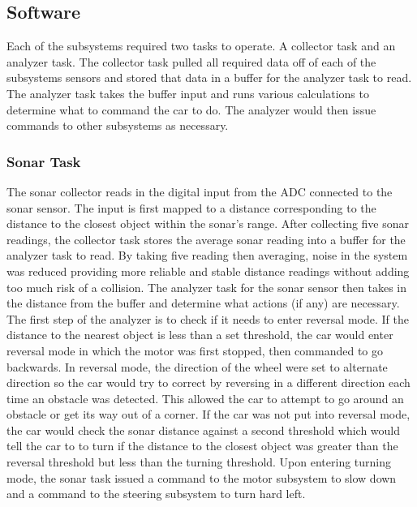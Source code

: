 \documentclass[final,letterpaper,singleside,12pt]{article}
\begin{document}
\pagebreak

\subsection{Software} %
\label{sub:software}
Each of the subsystems required two tasks to operate. A collector task and an analyzer task. The collector task pulled all required data off of each of the subsystems sensors and stored that data in a buffer for the analyzer task to read. The analyzer task takes the buffer input and runs various calculations to determine what to command the car to do. The analyzer would then issue commands to other subsystems as necessary.
\subsubsection{Sonar Task} %
\label{ssub:sonar_task}
The sonar collector reads in the digital input from the ADC connected to the sonar sensor. The input is first mapped to a distance corresponding to the distance to the closest object within the sonar's range. After collecting five sonar readings, the collector task stores the average sonar reading into a buffer for the analyzer task to read. By taking five reading then averaging, noise in the system was reduced providing more reliable and stable distance readings without adding too much risk of a collision. The analyzer task for the sonar sensor then takes in the distance from the buffer and determine what actions (if any) are necessary. The first step of the analyzer is to check if it needs to enter reversal mode. If the distance to the nearest object is less than a set threshold, the car would enter reversal mode in which the motor was first stopped, then commanded to go backwards. In reversal mode, the direction of the wheel were set to alternate direction so the car would try to correct by reversing in a different direction each time an obstacle was detected. This allowed the car to attempt to go around an obstacle or get its way out of a corner. If the car was not put into reversal mode, the car would check the sonar distance against a second threshold which would tell the car to to turn if the distance to the closest object was greater than the reversal threshold but less than the turning threshold. Upon entering turning mode, the sonar task issued a command to the motor subsystem to slow down and a command to the steering subsystem to turn hard left.
\end{document}
